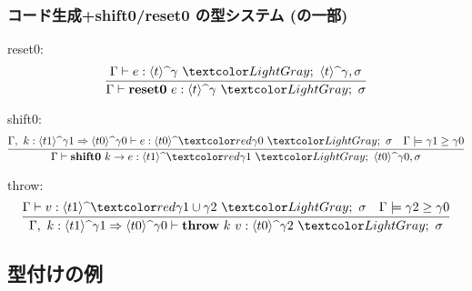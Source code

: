 

\begin{frame}[fragile]
  \frametitle{コード生成+shift0/reset0 の型システム\small{ (の一部)}}
  reset0:
  \[
    \infer{\Gamma \vdash \resetz{e} : \codeTs{t}{\gamma} ~ \lgray{;~ \sigma}}
    {\Gamma \vdash e : \codeTs{t}{\gamma} ~\lgray{;~ \codeTs{t}{\gamma}, \sigma}}
  \]

  shift0:
  \[
    \infer{\Gamma \vdash \shiftz{k}{e} : \codeTs{t1}{\red{\gamma1}} ~\lgray{;~ \codeTs{t0}{\gamma0},\sigma}}
    {\Gamma,~k:\contT{\codeTs{t1}{\gamma1}}{\codeTs{t0}{\gamma0}}
      \vdash e : \codeTs{t0}{\red{\gamma0}} ~\lgray{;~ \sigma}
      & \Gamma \models \gamma1 \ord \gamma0
    }
  \]

  throw:
  \[
    \infer
    {\Gamma,~k:\contT{\codeTs{t1}{\gamma1}}{\codeTs{t0}{\gamma0}}
      \vdash \throw{k}{v} : \codeTs{t0}{\gamma2} ~\lgray{;~ \sigma}}
    {\Gamma
      \vdash v : \codeTs{t1}{\red{\gamma1 \cup \gamma2}} ~\lgray{;~ \sigma}
      & \Gamma \models \gamma2 \ord \gamma0
    }
  \]
\end{frame}

\subsection{型付けの例}

\newcommand\boxterm{\framebox{
    \only<1>{\phantom{a}}
    \only<2>{\green{$\cint{3}$}}
    \only<3>{\red{$x$}}
  }}

